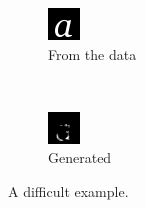 \begin{figure}
	\begin{center}
	\begin{subfigure}[t]{0.45\textwidth}
		\centering
		\includegraphics[scale=1]{tensors/sandc/valid/real/Georgiai-97}
		\caption{From the data}
	\end{subfigure}
	~
	\begin{subfigure}[t]{0.45\textwidth}
		\centering
		\includegraphics[scale=1]{tensors/sandc/valid/synth/Georgiai-97}
		\caption{Generated}
	\end{subfigure}
	\end{center}
	\caption{A difficult example.}
	\label{fig:sandc-fail}
\end{figure}


